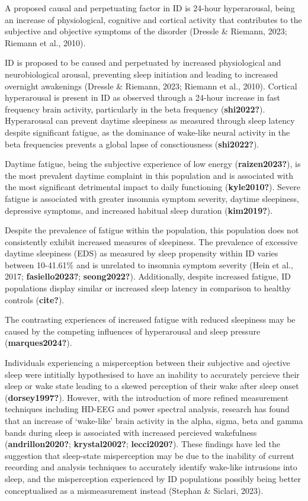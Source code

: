\documentclass[
]{article}
\begin{document}
A proposed causal and perpetuating factor in ID is 24-hour hyperarousal,
being an increase of physiological, cognitive and cortical activity that
contributes to the subjective and objective symptoms of the disorder
(Dressle \& Riemann, 2023; Riemann et al., 2010).

ID is proposed to be caused and perpetuated by increased physiological
and neurobiological arousal, preventing sleep initiation and leading to
increased overnight awakenings (Dressle \& Riemann, 2023; Riemann et
al., 2010). Cortical hyperarousal is present in ID as observed through a
24-hour increase in fast frequency brain activity, particularly in the
beta frequency (\textbf{shi2022?}). Hyperarousal can prevent daytime
sleepiness as measured through sleep latency despite significant
fatigue, as the dominance of wake-like neural activity in the beta
frequencies prevents a global lapse of consctiousness
(\textbf{shi2022?}).

Daytime fatigue, being the subjective experience of low energy
(\textbf{raizen2023?}), is the most prevalent daytime complaint in this
population and is associated with the most significant detrimental
impact to daily functioning (\textbf{kyle2010?}). Severe fatigue is
associated with greater insomnia symptom severity, daytime sleepiness,
depressive symptoms, and increased habitual sleep duration
(\textbf{kim2019?}).

Despite the prevalence of fatigue within the population, this population
does not consistently exhibit increased measures of sleepiness. The
prevalence of excessive daytime sleepiness (EDS) as measured by sleep
propensity within ID varies between 10-41.61\% and is unrelated to
insomnia symptom severity (Hein et al., 2017; \textbf{fasiello2023?};
\textbf{seong2022?}). Additionally, despite increased fatigue, ID
populations display similar or increased sleep latency in comparison to
healthy controls (\textbf{cite?}).

The contrasting experiences of increased fatigue with reduced sleepiness
may be caused by the competing influences of hyperarousal and sleep
pressure (\textbf{marques2024?}).

Individuals experiencing a misperception between their subjective and
ojective sleep were intitially hypothesised to have an inability to
accurately percieve their sleep or wake state leading to a skewed
perception of their wake after sleep onset (\textbf{dorsey1997?}).
However, with the introduction of more refined measurement techniques
including HD-EEG and power spectral analysis, research has found that an
increase of `wake-like' brain activity in the alpha, sigma, beta and
gamma bands during sleep is associated with increased percieved
wakefulness (\textbf{andrillon2020?}; \textbf{krystal2002?};
\textbf{lecci2020?}). These findings have led the suggestion that
sleep-state misperception may be due to the inability of current
recording and analysis techniques to accurately identify wake-like
intrusions into sleep, and the misperception experienced by ID
populations possibly being better conceptualised as a mismeasurement
instead (Stephan \& Siclari, 2023).
\end{document}
